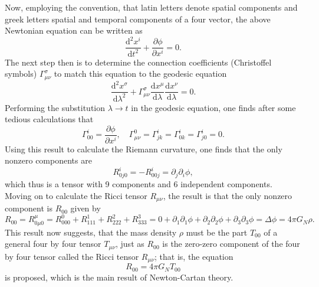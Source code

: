 \documentclass[a4paper,11pt]{article}
\numberwithin{equation}{section}
\begin{document}
{Now, employing the convention, that latin letters denote spatial components and greek letters spatial and temporal components of a four vector, the above Newtonian equation can be written as \begin{equation}
	\frac{\mathrm{d}^2x^i}{\mathrm{d}t^2} + \frac{\partial \phi}{\partial x^i} = 0.
\end{equation} The next step then is to determine the connection coefficients (Christoffel symbols) $\Gamma^\sigma_{\mu\nu}$ to match this equation to the geodesic equation \begin{equation}
\frac{\mathrm{d}^2x^\sigma}{\mathrm{d}\lambda^2} + \Gamma^\sigma_{\mu\nu}\frac{\mathrm{d}x^\mu}{\mathrm{d}\lambda}\frac{\mathrm{d}x^\nu}{\mathrm{d}\lambda} = 0.
\end{equation} Performing the substitution $\lambda \rightarrow t$ in the geodesic equation, one finds after some tedious calculations that \begin{equation}
\Gamma^i_{00} = \frac{\partial \phi}{\partial x^i}, \quad \Gamma^0_{\mu\nu} = \Gamma^i_{jk} = \Gamma^i_{0k} = \Gamma^i_{j0} = 0.
\end{equation} Using this result to calculate the Riemann curvature, one finds that the only nonzero components are \begin{equation}
R^i_{0j0} = -R^i_{00j} = \partial_j\partial_i\phi,
\end{equation} which thus is a tensor with 9 components and 6 independent components. Moving on to calculate the Ricci tensor $R_{\mu\nu}$, the result is that the only nonzero component is $R_{00}$ given by \begin{equation}
R_{00} = R^\mu_{0\mu 0} = R^0_{000} + R^1_{111} + R^2_{222} + R^3_{333} = 0 + \partial_1\partial_1 \phi + \partial_2\partial_2 \phi + \partial_3\partial_3 \phi = \Delta \phi = 4\pi G_N \rho.
\end{equation} This result now suggests, that the mass density $\rho$ must be the part $T_{00}$ of a general four by four tensor $T_{\mu\nu}$, just as $R_{00}$ is the zero-zero component of the four by four tensor called the Ricci tensor $R_{\mu\nu}$; that is, the equation \begin{equation}\label{eq:newtoncartan}
R_{00} = 4\pi G_N T_{00}
\end{equation} is proposed, which is the main result of Newton-Cartan theory.
}
\end{document}
